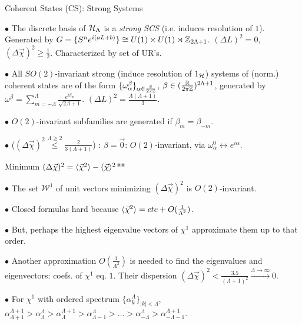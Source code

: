 \begin{frame}{Coherent States (CS): Strong Systems} %

    $\bullet$ The discrete basis of $\mathcal H_\Lambda$ is a \textit{strong SCS} (i.e. induces resolution of $1$). Generated by $G = \{S^n e^{i(aL + b)}\}\cong U(1)\times U(1) \rtimes \mathbb Z_{2\Lambda + 1}$. $(\Delta L)^2 = 0$, $(\Delta \vec \chi)^2 \geq \frac{1}{2}$. Characterized by set of UR's.
    
    $\bullet$ All $SO(2)$-invariant strong (induce resolution of $1_\mathcal H$) systems of (norm.) coherent states are of the form $\{\omega^\beta_\alpha\}_{\alpha \in \frac{\mathbb R}{2\pi\mathbb Z}}$, $\beta \in (\frac{\mathbb R}{2\pi\mathbb Z})^{2\Lambda+1}$, generated by $\omega^\beta = \sum_{m = -\Lambda}^\Lambda \frac{e^{i\beta_m}}{\sqrt{2\Lambda+1}}$. $(\Delta L)^2 = \frac{\Lambda(\Lambda + 1)}{3}$.
    
    $\bullet$ $O(2)$-invariant subfamilies are generated if $\beta_m = \beta_{-m}$. 
    
    $\bullet$  ($(\Delta \vec \chi)^2 \overset{\Lambda \geq 2}{\leq } \frac{2}{3(\Lambda + 1)}$) :  $\beta = \vec 0$: $O(2)$-invariant,  via $\omega^0_\alpha \leftrightarrow e^{i \alpha}$.
\end{frame}

\begin{frame}{Minimum $(\Delta \vec \chi)^2 = \langle \vec \chi^2 \rangle - \langle \vec \chi \rangle ^2$**} %

    $\bullet$ The set $\mathcal W^1$ of unit vectors minimizing $(\Delta \vec \chi)^2$ is $O(2)$-invariant.
    
    $\bullet$ Closed formulas hard because $\langle \vec \chi ^2 \rangle = cte + O(\frac{1}{\Lambda^2})$.
    
    $\bullet$ But, perhaps the highest eigenvalue vectors of $\chi^1$ approximate them up to that order.
    
    $\bullet$ Another approximation $O(\frac{1}{\Lambda^2})$ is needed to find the eigenvalues and eigenvectors: coefs. of $\chi^1$ eq. $1$. Their dispersion $(\Delta \vec \chi)^2 < \frac{3.5}{(\Lambda+1)^2} \overset{\Lambda \to \infty}{\longrightarrow} 0$.
    
    $\bullet$ For $\chi^1$ with ordered spectrum $\{\alpha^\Lambda_k\}_{|k|<\Lambda}$, 
    $\alpha_{\Lambda+1}^{\Lambda+1} > \alpha_{\Lambda}^{\Lambda} > \alpha_\Lambda^{\Lambda+1} > \alpha_{\Lambda-1}^{\Lambda} > \dots > \alpha_{-\Lambda}^{\Lambda} > \alpha_{-\Lambda-1}^{\Lambda+1}$.
    
\end{frame}